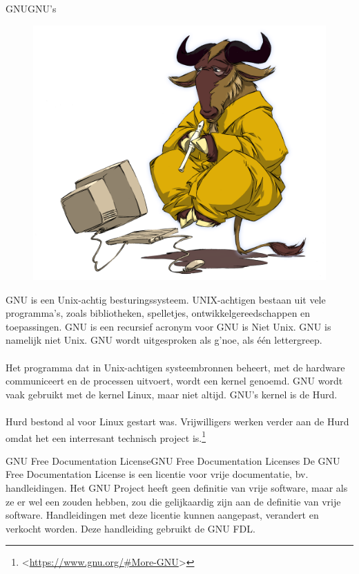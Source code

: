 \documentclass[11pt,a5paper,twoside]{book}
\newcommand{\BETEREURL}[1]{\mbox{<\url{#1}>}}
\begin{document}
  \begin{WOORD}{GNU}{GNU’s}
   \begin{figure}
    \centering
    \includegraphics[width=0.8\linewidth]{e/levignu.png}
   \end{figure}
   GNU is een Unix-achtig besturingssysteem.
   UNIX-achtigen bestaan uit vele programma’s, zoals
    bibliotheken, spelletjes, ontwikkelgereedschappen
    en toepassingen. GNU is een recursief acronym voor GNU
    is Niet Unix. GNU is namelijk niet Unix. GNU wordt
    uitgesproken als g'noe, als één lettergreep.
   \paragraph{} Het programma dat in Unix-achtigen systeembronnen
    beheert, met de hardware communiceert en de processen uitvoert,
    wordt een kernel genoemd. GNU wordt vaak gebruikt met de
    kernel Linux, maar niet altijd. GNU’s kernel is de Hurd.
   \paragraph{} Hurd bestond al voor Linux gestart was. Vrijwilligers
    werken verder aan de Hurd omdat het een interresant technisch project
    is.\footnote{\BETEREURL{https://www.gnu.org/\#More-GNU}}
  \end{WOORD}
  \begin{WOORD}{GNU Free Documentation License}{GNU Free Documentation Licenses}
   De GNU Free Documentation License is een licentie voor vrije documentatie,
    bv. handleidingen.
   Het GNU Project heeft geen definitie van vrije software, maar als ze er wel
    een zouden hebben, zou die gelijkaardig zijn aan de definitie van vrije software.
   Handleidingen met deze licentie kunnen aangepast, verandert en verkocht
    worden. Deze handleiding gebruikt de GNU FDL.
  \end{WOORD}
\end{document}
